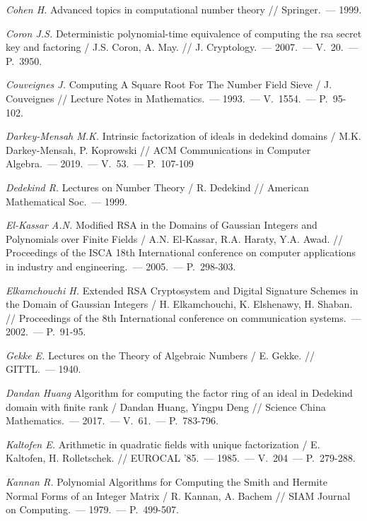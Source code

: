 \begin{thebibliography}{99}
    \textit{Cohen H.} Advanced topics in computational number theory // Springer.~--- 1999.
    
    \textit{Coron J.S.} Deterministic polynomial-time equivalence of computing the rsa secret key and factoring / J.S. Coron, A. May. // J. Cryptology.~--- 2007.~--- V.~20.~--- P.~3950.

    \textit{Couveignes J.} Computing A Square Root For The Number Field Sieve / J. Couveignes // Lecture Notes in Mathematics.~--- 1993.~--- V.~1554.~--- P.~95-102.

    \textit{Darkey-Mensah M.K.} Intrinsic factorization of ideals in dedekind domains / M.K. Darkey-Mensah, P. Koprowski // ACM Communications in Computer Algebra.~--- 2019.~--- V.~53.~--- P.~107-109

    \textit{Dedekind R.} Lectures on Number Theory / R. Dedekind // American Mathematical Soc.~--- 1999.

    \textit{El-Kassar A.N.} Modified RSA in the Domains of Gaussian Integers and Polynomials over Finite Fields / A.N. El-Kassar, R.A. Haraty, Y.A. Awad. // Proceedings of the ISCA 18th International conference on computer applications in industry and engineering.~--- 2005.~--- P.~298-303.

    \textit{Elkamchouchi H.} Extended RSA Cryptosystem and Digital Signature Schemes in the Domain of Gaussian Integers / H. Elkamchouchi, K. Elshenawy, H. Shaban. // Proceedings of the 8th International conference on communication systems.~--- 2002.~--- P.~91-95.

    \textit{Gekke E.} Lectures on the Theory of Algebraic Numbers / E. Gekke. // GITTL.~--- 1940.

    \textit{Dandan Huang} Algorithm for computing the factor ring of an ideal in Dedekind domain with finite rank / Dandan Huang, Yingpu Deng // Science China Mathematics.~--- 2017.~--- V.~61.~--- P.~783-796.

    \textit{Kaltofen E.} Arithmetic in quadratic fields with unique factorization / E. Kaltofen, H. Rolletschek. // EUROCAL '85.~--- 1985.~--- V.~204~--- P.~279-288.

    \textit{Kannan R.} Polynomial Algorithms for Computing the Smith and Hermite Normal Forms of an Integer Matrix / R. Kannan, A. Bachem // SIAM Journal on Computing.~--- 1979.~--- P.~499-507.


\end{thebibliography}
